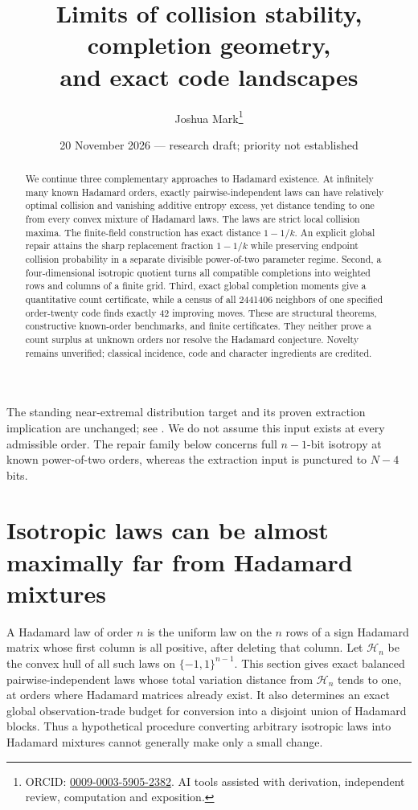 \documentclass[11pt]{article}
\title{Limits of collision stability, completion geometry,\\and exact code landscapes}
\author{Joshua Mark\thanks{ORCID: \href{https://orcid.org/0009-0003-5905-2382}{0009-0003-5905-2382}. AI tools assisted with derivation, independent review, computation and exposition.}}
\date{20 November 2026 --- research draft; priority not established}
\begin{document}
\maketitle

\begin{abstract}
We continue three complementary approaches to Hadamard existence.
At infinitely many known Hadamard orders, exactly pairwise-independent
laws can have relatively optimal collision and vanishing additive
entropy excess, yet distance tending to one from every convex mixture
of Hadamard laws. The laws are strict local collision maxima.
The finite-field construction has exact distance $1-1/k$.
An explicit global repair attains the sharp replacement fraction
$1-1/k$ while preserving endpoint collision probability in a separate
divisible power-of-two parameter regime.
Second, a four-dimensional isotropic quotient turns all compatible
completions into weighted rows and columns of a finite grid.
Third, exact global completion moments give a quantitative count
certificate, while a census of all 2441406 neighbors of one specified
order-twenty code finds exactly 42 improving moves.
These are structural theorems, constructive known-order benchmarks,
and finite certificates. They neither prove a count surplus at
unknown orders nor resolve the Hadamard conjecture. Novelty remains
unverified; classical incidence, code and character ingredients are
credited.
\end{abstract}
The standing near-extremal distribution target and its proven
extraction implication are unchanged; see
. We do not assume this input
exists at every admissible order. The repair family below concerns
full $n-1$-bit isotropy at known power-of-two orders, whereas the
extraction input is punctured to $N-4$ bits.
\section{Isotropic laws can be almost maximally far from Hadamard mixtures}
\label{sec:design-hadamard-distance}
A Hadamard law of order $n$ is the uniform law on the $n$ rows of a
sign Hadamard matrix whose first column is all positive, after deleting
that column. Let $\mathcal H_n$ be the convex hull of all such laws on
$\{-1,1\}^{n-1}$. This section gives exact balanced pairwise-independent
laws whose total variation distance from $\mathcal H_n$ tends to one,
at orders where Hadamard matrices already exist. It also determines
an exact global observation-trade budget for conversion into a disjoint
union of Hadamard blocks. Thus a hypothetical procedure converting
arbitrary isotropic laws into Hadamard mixtures cannot generally make
only a small change.
\end{document}
